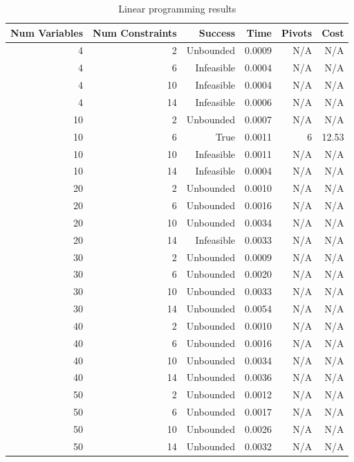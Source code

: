 \begin{table}[ht]
    \centering
    \begin{tabular}{rrrrrr}
        \toprule
        Num Variables & Num Constraints & Success & Time & Pivots & Cost \\
        \midrule
        4 & 2 & Unbounded & 0.0009 & N/A & N/A \\
		4 & 6 & Infeasible & 0.0004 & N/A & N/A \\
		4 & 10 & Infeasible & 0.0004 & N/A & N/A \\
		4 & 14 & Infeasible & 0.0006 & N/A & N/A \\
		10 & 2 & Unbounded & 0.0007 & N/A & N/A \\
		10 & 6 & True & 0.0011 & 6 & 12.53 \\
		10 & 10 & Infeasible & 0.0011 & N/A & N/A \\
		10 & 14 & Infeasible & 0.0004 & N/A & N/A \\
		20 & 2 & Unbounded & 0.0010 & N/A & N/A \\
		20 & 6 & Unbounded & 0.0016 & N/A & N/A \\
		20 & 10 & Unbounded & 0.0034 & N/A & N/A \\
		20 & 14 & Infeasible & 0.0033 & N/A & N/A \\
		30 & 2 & Unbounded & 0.0009 & N/A & N/A \\
		30 & 6 & Unbounded & 0.0020 & N/A & N/A \\
		30 & 10 & Unbounded & 0.0033 & N/A & N/A \\
		30 & 14 & Unbounded & 0.0054 & N/A & N/A \\
		40 & 2 & Unbounded & 0.0010 & N/A & N/A \\
		40 & 6 & Unbounded & 0.0016 & N/A & N/A \\
		40 & 10 & Unbounded & 0.0034 & N/A & N/A \\
		40 & 14 & Unbounded & 0.0036 & N/A & N/A \\
		50 & 2 & Unbounded & 0.0012 & N/A & N/A \\
		50 & 6 & Unbounded & 0.0017 & N/A & N/A \\
		50 & 10 & Unbounded & 0.0026 & N/A & N/A \\
		50 & 14 & Unbounded & 0.0032 & N/A & N/A \\
        \bottomrule
    \end{tabular}
    \caption{Linear programming results}
    \label{tab:lp-results}
\end{table}